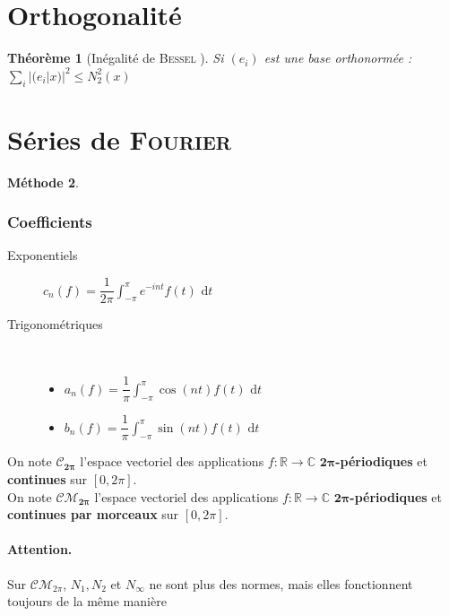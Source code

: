 \documentclass[11pt,a4paper]{report}
\newtheorem{theorem}{Théorème}[chapter]
\theoremstyle{definition}
\newtheorem{methode}[theorem]{Méthode}
\begin{document}
\section{Orthogonalité}
\begin{theorem}[Inégalité de \textsc{Bessel} ]
Si $(e_i)$ est une base orthonormée : 
$\boxed{\sum_i |(e_i|x)|^2 \le N_2^2 (x)}$
\end{theorem}
\section{Séries de \textsc{Fourier}}
\begin{methode}
\subsubsection*{Coefficients}
\begin{description}
\item[Exponentiels] $c_n(f) = \dfrac{1}{2\pi} \int_{-\pi}^{\pi}e^{-int} f(t)\, \,\mathrm{d} t$
\item[Trigonométriques] \hfill \\[-10pt]
    \begin{itemize}\itemsep2pt
        \item $a_n(f) = \dfrac{1}{\pi} \int_{-\pi}^{\pi} \cos (nt) f(t)\, \,\mathrm{d} t$
        \item $b_n(f) = \dfrac{1}{\pi} \int_{-\pi}^{\pi} \sin (nt) f(t)\, \,\mathrm{d} t$
    \end{itemize}
\end{description}
\end{methode}
On note $\boldsymbol{ \mathcal{C}_{2\pi}}$ l'espace vectoriel des applications $f : \ensuremath{\mathbb{R}} \to \ensuremath{\mathbb{C}}$ \textbf{{$\boldsymbol{ 2\pi}$-périodiques}} et \textbf{continues} sur $[0,2\pi]$.\\
On note $\boldsymbol{ \mathcal{CM}_{2\pi}}$ l'espace vectoriel des applications $f : \ensuremath{\mathbb{R}} \to \ensuremath{\mathbb{C}}$ \textbf{{$\boldsymbol{ 2\pi}$-périodiques}} et \textbf{continues par morceaux} sur $[0,2\pi]$.\\[3pt]
\paragraph{Attention.} Sur $\mathcal{CM}_{2\pi}$, $N_1, N_2$ et $N_\infty$ ne sont plus des normes, mais elles fonctionnent toujours de la même manière
\end{document}
